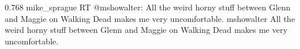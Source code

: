 %
%
%
{0.768}
{\joinNameTweet
{mike\_sprague}
{RT @mshowalter: All the weird horny stuff between Glenn and Maggie on Walking Dead makes me very uncomfortable.}}
{\joinNameTweet
{mshowalter}
{All the weird horny stuff between Glenn and Maggie on Walking Dead makes me very uncomfortable.}}
%
%
%
%
%
